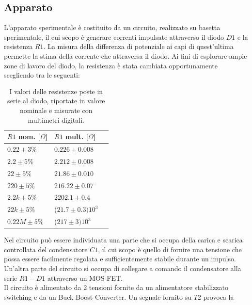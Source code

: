 \documentclass{article}[a4paper, oneside, 11pt]
\begin{document}
\subsection{Apparato}
L'apparato sperimentale è costituito da un circuito, realizzato su basetta 
sperimentale, il cui scopo è generare correnti impulsate attraverso il diodo 
$D1$ e la resistenza $R1$. La misura della differenza di potenziale ai capi di 
quest'ultima
permette la stima della corrente che attraversa il diodo. Ai fini di esplorare 
ampie zone 
di lavoro del diodo, la resistenza è stata cambiata opportunamente scegliendo 
tra le seguenti:
\begin{table}[H]%
    \begin{center}
	\begin{tabular}{lll}
	    \toprule
	    $R1$ nom. [$\Omega$] & $R1$ mult. [$\Omega$] \\ 
	    \midrule
	    \midrule
	    $0.22 \pm 3 \% $         & $0.226 \pm 0.008$ \\
	    $2.2 \pm 5 \% $          & $2.212 \pm 0.008$ \\
	    $22 \pm 5 \% $           & $21.86 \pm 0.010$ \\ 
	    $220 \pm 5 \% $          & $216.22 \pm 0.07$ \\
	    $2.2 k \pm 5 \% $        & $2202.1 \pm 0.4$ \\
	    $22 k \pm 5 \% $         & ($21.7 \pm 0.3)10^3$ \\
	    $0.22 M \pm 5 \% $        & ($217 \pm 3)10^3$ \\
	    \bottomrule
	\end{tabular}
	\caption{I valori delle resistenze poste in serie al diodo, riportate in
		valore nominale e misurate con multimetri digitali. \label{tab:res}}
    \end{center}
\end{table}
Nel circuito può essere individuata una parte che si occupa della carica e 
scarica controllata del condensatore $C1$, il cui scopo è quello di fornire 
una tensione che possa essere facilmente regolata e sufficientemente stabile 
durante un impulso. Un'altra parte del circuito si occupa di collegare a 
comando il condensatore alla serie $R1-D1$ attraverso un MOS-FET.\\
Il circuito è alimentato da 2 tensioni fornite da un alimentatore stabilizzato 
switching e da un Buck Boost Converter. Un segnale fornito su $T2$ provoca la 
\end{document}

